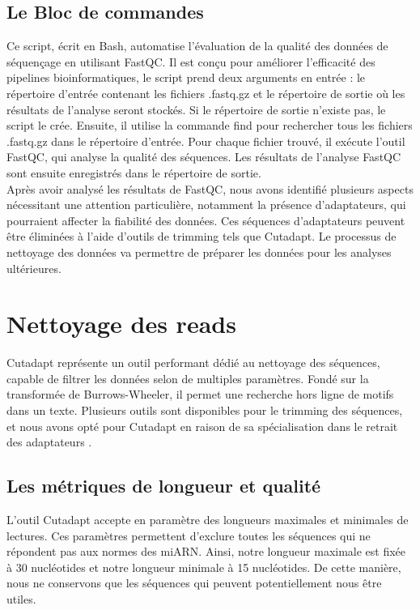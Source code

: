 \subsection*{Le Bloc de commandes}
Ce script, écrit en Bash, automatise l'évaluation de la qualité des données de séquençage en utilisant FastQC. Il est conçu pour améliorer l'efficacité des pipelines bioinformatiques, le script prend deux arguments en entrée : le répertoire d’entrée contenant les fichiers .fastq.gz et le répertoire de sortie où les résultats de l’analyse seront stockés. Si le répertoire de sortie n’existe pas, le script le crée. Ensuite, il utilise la commande find pour rechercher tous les fichiers .fastq.gz dans le répertoire d’entrée. Pour chaque fichier trouvé, il exécute l’outil FastQC, qui analyse la qualité des séquences. Les résultats de l’analyse FastQC sont ensuite enregistrés dans le répertoire de sortie.\\

Après avoir analysé les résultats de FastQC, nous avons identifié plusieurs aspects nécessitant une attention particulière, notamment la présence d'adaptateurs, qui pourraient affecter la fiabilité des données. Ces séquences d'adaptateurs peuvent être éliminées à l'aide d'outils de trimming tels que Cutadapt. Le processus de nettoyage des données va permettre de préparer les données pour les analyses ultérieures.\\

\section{Nettoyage des reads}
Cutadapt représente un outil performant dédié au nettoyage des séquences, capable de filtrer les données selon de multiples paramètres. Fondé sur la transformée de Burrows-Wheeler, il permet une recherche hors ligne de motifs dans un texte. Plusieurs outils sont disponibles pour le trimming des séquences, et nous avons opté pour Cutadapt en raison de sa spécialisation dans le retrait des adaptateurs \cite{martin2011cutadapt}. 

\subsection*{Les métriques de longueur et qualité}
L'outil Cutadapt accepte en paramètre des longueurs maximales et minimales de lectures. Ces paramètres permettent d'exclure toutes les séquences qui ne répondent pas aux normes des miARN. Ainsi, notre longueur maximale est fixée à 30 nucléotides et notre longueur minimale à 15 nucléotides. De cette manière, nous ne conservons que les séquences qui peuvent potentiellement nous être utiles.

